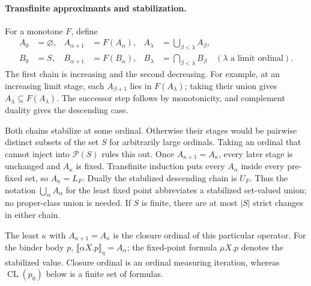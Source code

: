 \paragraph{Transfinite approximants and stabilization.}
For a monotone \(F\), define
\[
\begin{aligned}
 A_0&=\varnothing,& A_{\alpha+1}&=F(A_\alpha),&
 A_\lambda&=\bigcup_{\beta<\lambda}A_\beta,\\
 B_0&=S,& B_{\alpha+1}&=F(B_\alpha),&
 B_\lambda&=\bigcap_{\beta<\lambda}B_\beta
                  \quad(\lambda\text{ a limit ordinal}).
\end{aligned}
\]
The first chain is increasing and the second decreasing.
For example, at an increasing limit stage, each
\(A_{\beta+1}\) lies in \(F(A_\lambda)\); taking their
union gives \(A_\lambda\subseteq F(A_\lambda)\).
The successor step follows by monotonicity, and
complement duality gives the descending case.

Both chains stabilize at some ordinal. Otherwise
their stages would be pairwise distinct subsets of
the set \(S\) for arbitrarily large ordinals. Taking
an ordinal that cannot inject into \(\mathcal P(S)\)
rules this out.
Once \(A_{\kappa+1}=A_\kappa\), every later stage is
unchanged and \(A_\kappa\) is fixed. Transfinite
induction puts every \(A_\alpha\) inside every
pre-fixed set, so \(A_\kappa=L_F\). Dually the
stabilized descending chain is \(U_F\).
Thus the notation \(\bigcup_\alpha A_\alpha\)
for the least fixed point abbreviates a stabilized
set-valued union; no proper-class union is needed.
If \(S\) is finite, there are at most \(|S|\) strict
changes in either chain.

The least \(\kappa\) with
\(A_{\kappa+1}=A_\kappa\) is the closure ordinal of
this particular operator. For the binder body \(p\),
\(\llbracket\alpha X.p\rrbracket_\eta=A_\alpha\);
the fixed-point formula \(\mu X.p\) denotes the
stabilized value. Closure ordinal is an ordinal
measuring iteration, whereas \(\operatorname{CL}(p_0)\)
below is a finite set of formulas.

